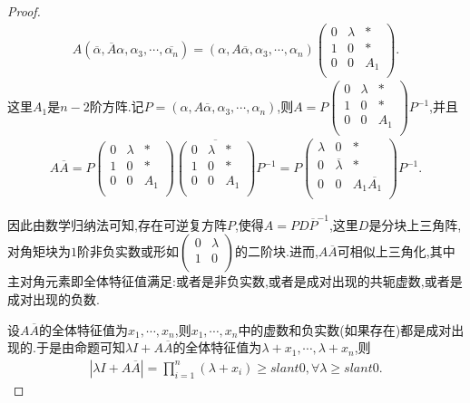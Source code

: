 \documentclass[../../main.tex]{subfiles}
\begin{document}
\begin{proof}
\begin{align*}
A\left( \overline{\alpha },\overline{A}\alpha ,\alpha _3,\cdots ,\overline{\alpha _n} \right) =\left( \alpha ,A\overline{\alpha },\alpha _3,\cdots ,\alpha _n \right) \begin{pmatrix}
0&		\lambda&		*\\
1&		0&		*\\
0&		0&		A_1\\
\end{pmatrix}.
\end{align*}
这里$A_1$是$n-2$阶方阵.记$P=\left( \alpha ,A\overline{\alpha },\alpha _3,\cdots ,\alpha _n \right)$,则$A=P\begin{pmatrix}
0&		\lambda&		*\\
1&		0&		*\\
0&		0&		A_1\\
\end{pmatrix} P^{-1}$,并且
\begin{align*}
A\overline{A}=P\begin{pmatrix}
0&		\lambda&		*\\
1&		0&		*\\
0&		0&		A_1\\
\end{pmatrix} \overline{\begin{pmatrix}
0&		\lambda&		*\\
1&		0&		*\\
0&		0&		A_1\\
\end{pmatrix} }P^{-1}=P\begin{pmatrix}
\lambda&		0&		*\\
0&		\overline{\lambda }&		*\\
0&		0&		A_1\overline{A_1}\\
\end{pmatrix} P^{-1}.
\end{align*}

因此由数学归纳法可知,存在可逆复方阵$P$,使得$A=PD\overline{P}^{-1}$,这里$D$是分块上三角阵,对角矩块为$1$阶非负实数或形如$\begin{pmatrix}
0&		\lambda\\
1&		0\\
\end{pmatrix}$的二阶块.进而,$A\overline{A}$可相似上三角化,其中主对角元素即全体特征值满足:或者是非负实数,或者是成对出现的共轭虚数,或者是成对出现的负数.

设$A\overline{A}$的全体特征值为$x_1,\cdots ,x_n$,则$x_1,\cdots ,x_n$中的虚数和负实数(如果存在)都是成对出现的.于是由命题可知$\lambda I+A\overline{A}$的全体特征值为$\lambda +x_1,\cdots ,\lambda +x_n$,则
\begin{align*}
\left| \lambda I+A\overline{A} \right|=\prod_{i=1}^n{\left( \lambda +x_i \right)}\geqslant slant 0,\forall \lambda \geqslant slant 0.
\end{align*}
\end{proof}
\end{document}
